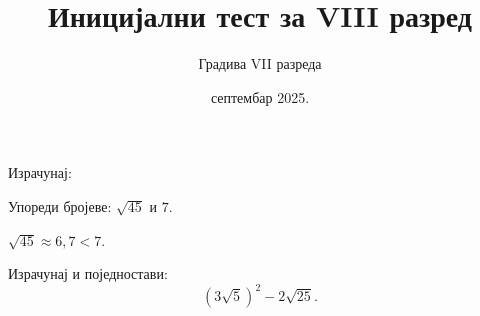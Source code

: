 \documentclass[11pt,a5paper,twoside,addpoints,noanswers]{exam} %
\title{Иницијални тест за VIII разред}
\author{Градива VII разреда}
\date{септембар 2025.}
\begin{document}
\maketitle
\thispagestyle{headandfoot}

\ifprintanswers\else
\begin{flushleft}
\gradetable[v]\newpage
\end{flushleft}
\fi

\begin{questions}

\question[6]
Израчунај:
\begin{multicols}{3}
\end{multicols}

\begin{solution}[\stretch 1]
\end{solution}

\question[6]
Упореди бројеве: $\sqrt{45}$ и $7$.

\begin{solution}[\stretch 1]
$\sqrt{45}\approx 6{,}7 < 7$.
\end{solution}

\ifprintanswers\else\newpage\fi

\question[6]
Израчунај и поједностави:
\[
(3\sqrt{5})^2 - 2\sqrt{25}.
\]


\end{questions}
\end{document}
